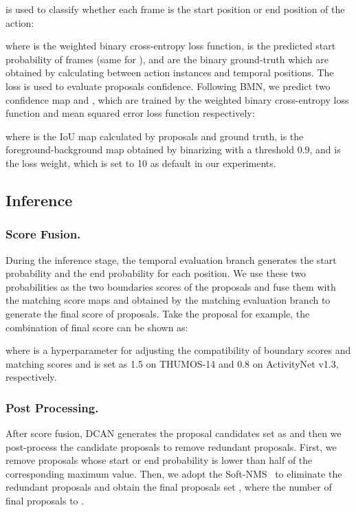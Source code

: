 \documentclass[letterpaper]{article} \usepackage{aaai22}  \usepackage{times}  \usepackage{helvet}  \usepackage{courier}  \usepackage[hyphens]{url}  \usepackage{graphicx} \urlstyle{rm} \def\UrlFont{\rm}  \usepackage{natbib}  \usepackage{caption} \DeclareCaptionStyle{ruled}{labelfont=normalfont,labelsep=colon,strut=off} \frenchspacing  \setlength{\pdfpagewidth}{8.5in}  \setlength{\pdfpageheight}{11in}  \usepackage{algorithm}
\begin{document}
 is used to classify whether each frame is the start position or end position of the action:

where  is the weighted binary cross-entropy loss function,  is the predicted start probability of frames (same for ),  and  are the binary ground-truth which are obtained by calculating  between action instances and temporal positions. The loss  is used to evaluate proposals confidence. Following BMN, we predict two confidence map  and , which are trained by the weighted binary cross-entropy loss function and mean squared error loss function respectively:

where  is the IoU map calculated by proposals and ground truth,  is the foreground-background map obtained by binarizing  with a threshold 0.9, and  is the loss weight, which is set to 10 as default in our experiments.



\subsection{Inference}















\subsubsection{Score Fusion.}
During the inference stage, the temporal evaluation branch generates the start probability  and the end probability  for each position.
We use these two probabilities as the two boundaries scores of the proposals and fuse them with the matching score maps  and  obtained by the matching evaluation branch to generate the final score of proposals.
Take the proposal   for example, the combination of final score  can be shown as:

where  is a hyperparameter for adjusting the compatibility of boundary scores and matching scores and is set as 1.5 on THUMOS-14 and 0.8 on ActivityNet v1.3, respectively.

\subsubsection{Post Processing.}
After score fusion, DCAN generates the proposal candidates set as  and then we post-process the candidate proposals to remove redundant proposals. 
First, we remove proposals whose start or end probability is lower than half of the corresponding maximum value. 
Then, we adopt the Soft-NMS~\cite{softnms} to eliminate the redundant proposals and obtain the final proposals set  , where the number of final proposals to .
\end{document}
